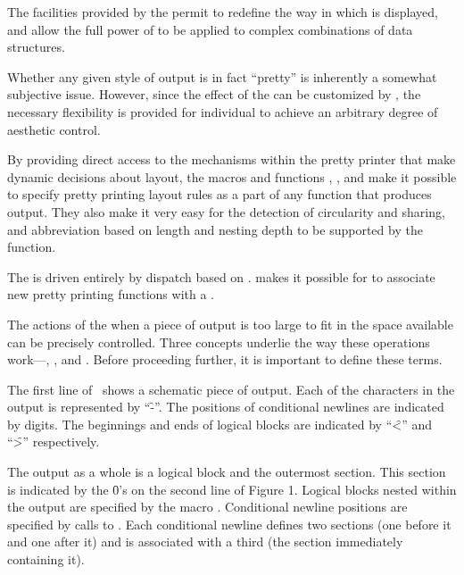 


The facilities provided by the  permit
 to redefine the way in which  is displayed, 
and allow the full power of  to be applied 
to complex combinations of data structures.

Whether any given style of output is in fact ``pretty'' is inherently a
somewhat subjective issue.  However, since the effect of the 
 can be customized by ,
the necessary flexibility is provided for individual 
to achieve an arbitrary degree of aesthetic control.

By providing direct access to the mechanisms within the pretty printer
that make dynamic decisions about layout, the macros and functions
, , and
 make it possible to specify pretty printing
layout rules as a part of any function that produces output.  They also
make it very easy for the detection of circularity and sharing, and
abbreviation based on length and nesting depth to be supported by the
function.

The  is driven entirely by dispatch based on
.
 makes it possible
for  to associate new pretty printing 
functions with a .

 
The actions of the  when a piece of output is too
large to fit in the space available can be precisely controlled.
Three concepts underlie 
the way these operations work---,
			        ,
			    and .
Before proceeding further, it is important to define these terms.
 
The first line of \thenextfigure\ shows a schematic piece of output.  Each of
the characters in the output is represented by ``\f{-}''.  The positions of
conditional newlines are indicated by digits.  The beginnings and ends of
logical blocks are indicated by ``\f{<}'' and ``\f{>}'' respectively.
 
The output as a whole is a logical block and the outermost section.  This
section is indicated by the \f{0}'s on the second line of Figure 1.  Logical
blocks nested within the output are specified by the macro
.  Conditional newline positions are specified 
by calls to .  Each conditional newline defines 
two sections (one before it and one after it) and is associated with a 
third (the section immediately containing it).
 
